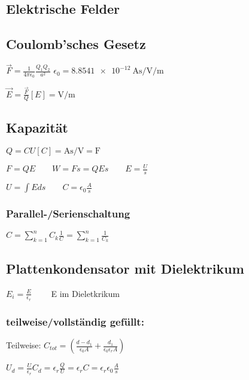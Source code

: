 \documentclass[10pt,a4paper]{scrartcl}
\begin{document}
\begin{multicols*}{3}
	\section{Elektrische Felder}
	
	\subsection{Coulomb'sches Gesetz}
	
	$\vec{F}=\frac{1}{4\pi\epsilon_0}\frac{Q_1Q_2}{a^2}$ \hfill$\epsilon_0=\SI{8.8541e-12}{\ampere\second\per\volt\per\meter}$
	
	$\vec{E}=\frac{\vec{F}}{Q}$\hfill$[E]=\si{\volt\per\meter}$

	\subsection{Kapazität}
	
	$Q = CU$\hfill$[C]=\si{\ampere\second\per\volt}=\si{\farad}$
	
	$F = QE\qquad W=Fs=QEs\qquad E = \frac{U}{s}$
	
	$U = \int{Eds}\qquad C=\epsilon_0\frac{A}{s}$
	
	
	\subsubsection{Parallel-/Serienschaltung}
	
	$C=\sum_{k=1}^n{C_k}$\hfill$\frac{1}{C}=\sum_{k=1}^n{\frac{1}{C_k}}$
	
	\subsection{Plattenkondensator mit Dielektrikum}
	
	$E_i=\frac{E}{\epsilon_r}\qquad$ E im Dieletkrikum
	
	\subsubsection{teilweise/vollständig gefüllt:}
	
	Teilweise: $C_{tot}=\left(\frac{d-d_1}{\epsilon_0 A}+\frac{d_1}{\epsilon_0\epsilon_rA}\right)$
	
	
	$U_d=\frac{U}{\epsilon_r}$\hfill$C_d=\epsilon_r\frac{Q}{U}=\epsilon_rC=\epsilon_r\epsilon_0\frac{A}{s}$ 
	

\end{multicols*}
\end{document}
